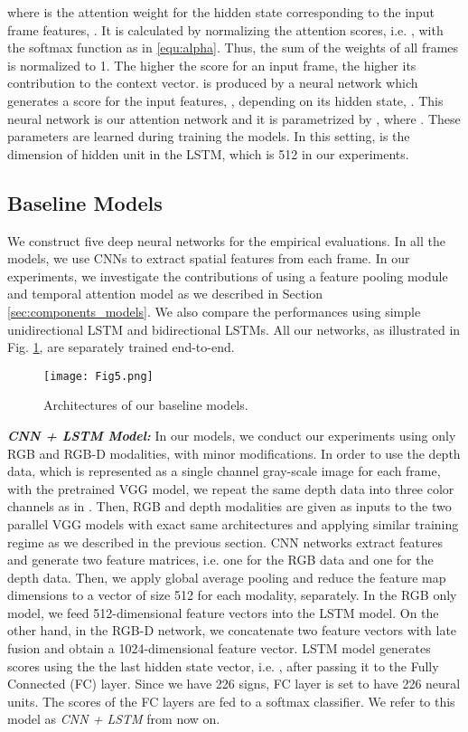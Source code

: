 \documentclass[11pt, a4paper, singlecolumn]{article}
\begin{document}
where  is the attention weight for the hidden state corresponding to the input frame features, . It is calculated by normalizing the attention scores, i.e. , with the softmax function as in \eqref{equ:alpha}. Thus, the sum of the weights of all frames is normalized to 1. The higher the score for an input frame, the higher its contribution to the context vector.  is produced by a neural network which generates a score for the input features, , depending on its hidden state, . This neural network is our attention network and it is parametrized by , where . These parameters are learned during training the models. In this setting,  is the dimension of hidden unit in the LSTM, which is 512 in our experiments.


\subsection{Baseline Models}
\label{sec:baseline_models}

We construct five deep neural networks for the empirical evaluations. In all the models, we use CNNs to extract spatial features from each frame. In our experiments, we investigate the contributions of using a feature pooling module and temporal attention model as we described in Section \ref{sec:components_models}. We also compare the performances using simple unidirectional LSTM and bidirectional LSTMs. All our networks, as illustrated in Fig. \ref{fig5}, are separately trained end-to-end.  

\begin{figure}
	\centering
	\texttt{[image: Fig5.png]}
	\caption{Architectures of our baseline models.}
	\label{fig5}
\end{figure}

\textit{\textbf{CNN + LSTM Model: }} In our models, we conduct our experiments using only RGB and RGB-D modalities, with minor modifications. In order to use the depth data, which is represented as a single channel gray-scale image for each frame, with the pretrained VGG model, we repeat the same depth data into three color channels as in \cite{eitel2015multimodal}. Then, RGB and depth modalities are given as inputs to the two parallel VGG models with exact same architectures and applying similar training regime as we described in the previous section. CNN networks extract features and generate two feature matrices, i.e. one for the RGB data and one for the depth data. Then, we apply global average pooling and reduce the feature map dimensions to a vector of size 512 for each modality, separately. In the RGB only model, we feed 512-dimensional feature vectors into the LSTM model. On the other hand, in the RGB-D network, we concatenate two feature vectors with late fusion and obtain a 1024-dimensional feature vector. LSTM model generates scores using the the last hidden state vector, i.e. , after passing it to the Fully Connected (FC) layer. Since we have 226 signs, FC layer is set to have 226 neural units. The scores of the FC layers are fed to a softmax classifier. We refer to this model as \textit{CNN + LSTM} from now on.
\end{document}
